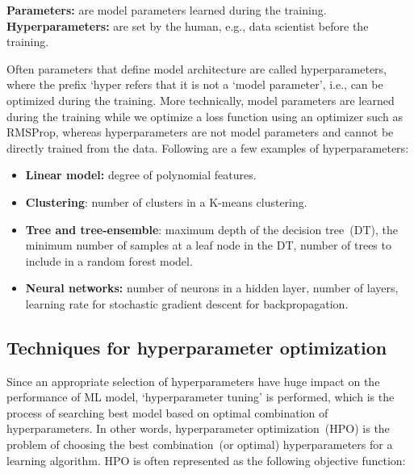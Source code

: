 \vspace{-2mm}
\begin{tcolorbox}[colback=white!3!white,colframe=gray!120!black,title=\faBook~Model parameters vs. hyperparameters]
    \scriptsize{
        \textbf{Parameters:} are model parameters learned during the training. \\
        \textbf{Hyperparameters:} are set by the human, e.g., data scientist before the training.
        }
\end{tcolorbox}

\hspace*{3.5mm} Often parameters that define model architecture are called hyperparameters, where the prefix `hyper refers that it is not a `model parameter', i.e., can be optimized during the training. More technically, model parameters are learned during the training while we optimize a loss function using an optimizer such as RMSProp, whereas hyperparameters are not model parameters and cannot be directly trained from the data. Following are a few examples of hyperparameters: 

\vspace{-2mm}
\begin{itemize}[noitemsep]
    \item \textbf{Linear model:} degree of polynomial features.
    \item \textbf{Clustering}: number of clusters in a K-means clustering.
    \item \textbf{Tree and tree-ensemble}: maximum depth of the decision tree~(DT), the minimum number of samples at a leaf node in the DT, number of trees to include in a random forest model. 
    \item \textbf{Neural networks:} number of neurons in a hidden layer, number of layers, learning rate for stochastic gradient descent for backpropagation. 
\end{itemize} 
\vspace{-2mm}

\subsection{Techniques for hyperparameter optimization}
Since an appropriate selection of hyperparameters have huge impact on the performance of ML model, `hyperparameter tuning' is performed, which is the process of searching best model based on optimal combination of hyperparameters. In other words, hyperparameter optimization~(HPO) is the problem of choosing the best combination~(or optimal) hyperparameters for a learning algorithm. HPO is often represented as the following objective function: 

